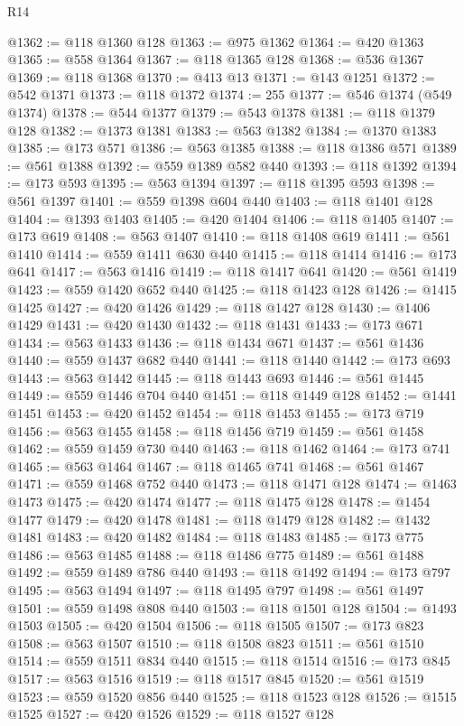 \begin{lexlean}{R14}
\begin{coremodule}
@1362 := @118 @1360 @128
@1363 := @975 @1362
@1364 := @420 @1363
@1365 := @558 @1364
@1367 := @118 @1365 @128
@1368 := @536 @1367
@1369 := @118 @1368
@1370 := @413 @13
@1371 := @143 @1251
@1372 := @542 @1371
@1373 := @118 @1372
@1374 := 255
@1377 := @546 @1374 (@549 @1374)
@1378 := @544 @1377
@1379 := @543 @1378
@1381 := @118 @1379 @128
@1382 := @1373 @1381
@1383 := @563 @1382
@1384 := @1370 @1383
@1385 := @173 @571
@1386 := @563 @1385
@1388 := @118 @1386 @571
@1389 := @561 @1388
@1392 := @559 @1389 @582 @440
@1393 := @118 @1392
@1394 := @173 @593
@1395 := @563 @1394
@1397 := @118 @1395 @593
@1398 := @561 @1397
@1401 := @559 @1398 @604 @440
@1403 := @118 @1401 @128
@1404 := @1393 @1403
@1405 := @420 @1404
@1406 := @118 @1405
@1407 := @173 @619
@1408 := @563 @1407
@1410 := @118 @1408 @619
@1411 := @561 @1410
@1414 := @559 @1411 @630 @440
@1415 := @118 @1414
@1416 := @173 @641
@1417 := @563 @1416
@1419 := @118 @1417 @641
@1420 := @561 @1419
@1423 := @559 @1420 @652 @440
@1425 := @118 @1423 @128
@1426 := @1415 @1425
@1427 := @420 @1426
@1429 := @118 @1427 @128
@1430 := @1406 @1429
@1431 := @420 @1430
@1432 := @118 @1431
@1433 := @173 @671
@1434 := @563 @1433
@1436 := @118 @1434 @671
@1437 := @561 @1436
@1440 := @559 @1437 @682 @440
@1441 := @118 @1440
@1442 := @173 @693
@1443 := @563 @1442
@1445 := @118 @1443 @693
@1446 := @561 @1445
@1449 := @559 @1446 @704 @440
@1451 := @118 @1449 @128
@1452 := @1441 @1451
@1453 := @420 @1452
@1454 := @118 @1453
@1455 := @173 @719
@1456 := @563 @1455
@1458 := @118 @1456 @719
@1459 := @561 @1458
@1462 := @559 @1459 @730 @440
@1463 := @118 @1462
@1464 := @173 @741
@1465 := @563 @1464
@1467 := @118 @1465 @741
@1468 := @561 @1467
@1471 := @559 @1468 @752 @440
@1473 := @118 @1471 @128
@1474 := @1463 @1473
@1475 := @420 @1474
@1477 := @118 @1475 @128
@1478 := @1454 @1477
@1479 := @420 @1478
@1481 := @118 @1479 @128
@1482 := @1432 @1481
@1483 := @420 @1482
@1484 := @118 @1483
@1485 := @173 @775
@1486 := @563 @1485
@1488 := @118 @1486 @775
@1489 := @561 @1488
@1492 := @559 @1489 @786 @440
@1493 := @118 @1492
@1494 := @173 @797
@1495 := @563 @1494
@1497 := @118 @1495 @797
@1498 := @561 @1497
@1501 := @559 @1498 @808 @440
@1503 := @118 @1501 @128
@1504 := @1493 @1503
@1505 := @420 @1504
@1506 := @118 @1505
@1507 := @173 @823
@1508 := @563 @1507
@1510 := @118 @1508 @823
@1511 := @561 @1510
@1514 := @559 @1511 @834 @440
@1515 := @118 @1514
@1516 := @173 @845
@1517 := @563 @1516
@1519 := @118 @1517 @845
@1520 := @561 @1519
@1523 := @559 @1520 @856 @440
@1525 := @118 @1523 @128
@1526 := @1515 @1525
@1527 := @420 @1526
@1529 := @118 @1527 @128

\end{coremodule}
\end{lexlean}

